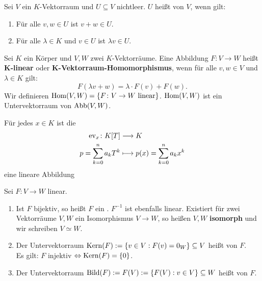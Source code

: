 \setcounter{definition}{3}
\begin{definition}[Untervektorraum]
	\label{def:I.5.4}
	Sei $V$ ein $K$-Vektorraum und $U \subseteq V$ nichtleer.
	$U$ heißt  von $V$, wenn gilt:
	\begin{enumerate}[(1)]
		\item Für alle $v,w \in U$ ist $v+w \in U$.
		\item Für alle $\lambda \in K$ und $v \in U$ ist $\lambda v \in U$.
	\end{enumerate}
\end{definition}

\setcounter{definition}{6}
\begin{definition}
	\label{def:I.5.7}
	Sei $K$ ein Körper und $V,W$ zwei $K$-Vektorräume.
	Eine Abbildung $F \colon V \rightarrow W$ heißt $\mathbf{K}$\textbf{-linear} oder $\mathbf{K}$\textbf{-Vektorraum-Homomorphismus}, wenn für alle $v,w \in V$ und $\lambda \in K$ gilt:
	\[
		F(\lambda v + w) = \lambda \cdot F(v) + F(w).
	\]
	Wir definieren $\operatorname{Hom}(V,W) = \{F \colon V \rightarrow W \text{ linear}\}$.
	$\operatorname{Hom}(V,W)$ ist ein Untervektorraum von $\operatorname{Abb}(V,W)$.
\end{definition}

\begin{beispiel}[Auswertungsabbildung]
	\label{bsp:I.5.8}
	Für jedes $x \in K$ ist die 
	\begin{align*}
		\operatorname{ev}_x \colon K[T] &\longrightarrow K \\
		p = \sum_{k=0}^{n} a_kT^k &\longmapsto p(x) = \sum_{k=0}^{n} a_kx^k
	\end{align*}
	eine lineare Abbildung
\end{beispiel}
\newpage
\begin{definition}
	\label{def:I.5.9}
	Sei $F\colon V \rightarrow W$ linear.
	\begin{enumerate}[(1)]
		\item Ist $F$ bijektiv, so heißt $F$ ein .
		$F^{-1}$ ist ebenfalls linear.
		Existiert für zwei Vektorräume $V,W$ ein Isomorphismus $V \rightarrow W$, so heißen $V,W$ \textbf{isomorph} und wir schreiben $V \simeq W$.
		\item Der Untervektorraum $\operatorname{Kern}(F) := \{v \in V : F(v) = 0_W\} \subseteq V$ heißt  von $F$. \\
		Es gilt: $F$ injektiv $\Leftrightarrow \operatorname{Kern}(F) = \{0\}$.
		\item Der Untervektorraum $\operatorname{Bild}(F) := F(V) := \{F(V) : v \in V\} \subseteq W$ heißt  von $F$.
	\end{enumerate}
\end{definition}